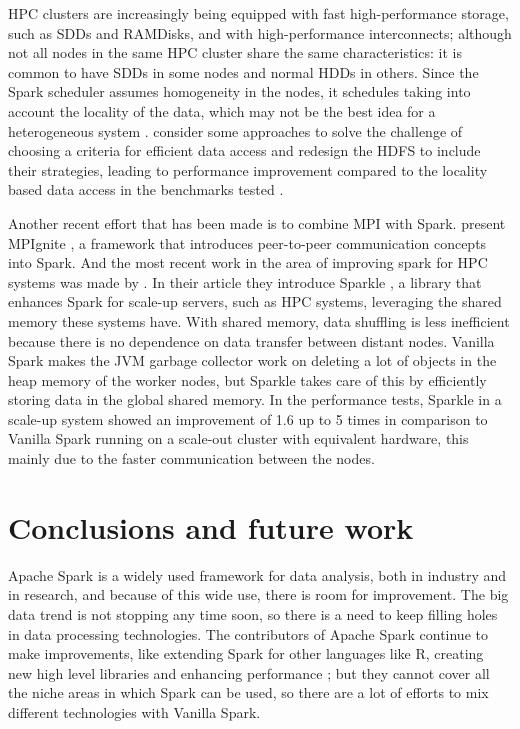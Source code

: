 \documentclass{article}
\begin{document}
HPC clusters are increasingly being equipped with fast high-performance storage, such as SDDs and RAMDisks, and with high-performance interconnects; although not all nodes in the same HPC cluster share the same characteristics: it is common to have SDDs in some nodes and normal HDDs in others. Since the Spark scheduler assumes homogeneity in the nodes, it schedules taking into account the locality of the data, which may not be the best idea for a heterogeneous system \cite{Islam2016}. \citeauthor{Islam2016} consider some approaches to solve the challenge of choosing a criteria for efficient data access and redesign the HDFS to include their strategies, leading to performance improvement compared to the locality based data access in the benchmarks tested \cite{Islam2016}.

Another recent effort that has been made is to combine MPI with Spark. \citeauthor{Morris2017} present MPIgnite \cite{Morris2017}, a framework that introduces peer-to-peer communication concepts into Spark. And the most recent work in the area of improving spark for HPC systems was made by \citeauthor{kim2017sparkle}. In their article they introduce Sparkle \cite{kim2017sparkle}, a library that enhances Spark for scale-up servers, such as HPC systems, leveraging the shared memory these systems have. With shared memory, data shuffling is less inefficient because there is no dependence on data transfer between distant nodes. Vanilla Spark makes the JVM garbage collector work on deleting a lot of objects in the heap memory of the worker nodes, but Sparkle takes care of this by efficiently storing data in the global shared memory. In the performance tests, Sparkle in a scale-up system showed an improvement of 1.6 up to 5 times in comparison to Vanilla Spark running on a scale-out cluster with equivalent hardware, this mainly due to the faster communication between the nodes.



\section{Conclusions and future work}
\label{sec:conclusion}

Apache Spark is a widely used framework for data analysis, both in industry and in research, and because of this wide use, there is room for improvement. The big data trend is not stopping any time soon, so there is a need to keep filling holes in data processing technologies. The contributors of Apache Spark continue to make improvements, like extending Spark for other languages like R, creating new high level libraries and enhancing performance \cite{zaharia_apache_2016}; but they cannot cover all the niche areas in which Spark can be used, so there are a lot of efforts to mix different technologies with Vanilla Spark.
\end{document}

